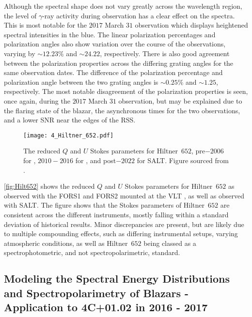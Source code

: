 Although the spectral shape does not vary greatly across the wavelength region, the level of $\gamma$-ray activity during observation has a clear effect on the spectra.
This is most notable for the $2017$ March $31$ observation which displays heightened spectral intensities in the blue.
The linear polarization percentages and polarization angles also show variation over the course of the observations, varying by $\sim 12.23\%$ and $\sim 24.22$\degree, respectively.
There is also good agreement between the polarization properties across the differing grating angles for the same observation dates.
The difference of the polarization percentage and polarization angle between the two grating angles is $\sim 0.25\%$ and $\sim 1.25$\degree, respectively.
The most notable disagreement of the polarization properties is seen, once again, during the $2017$ March $31$ observation, but may be explained due to the flaring state of the blazar, the asynchronous times for the two observations, and a lower \gls{SNR} near the edges of the \gls{RSS}.

\begin{figure}[t]
    \centering
    \texttt{[image: 4\_Hiltner\_652.pdf]}
    \caption{The reduced $Q$ and $U$ Stokes parameters for Hiltner~$652$, pre$-2006$ for , $2010 - 2016$ for , and post$-2022$ for \gls{SALT}. Figure sourced from \citep{cooper_HEASA2022}.}
    \label{fig:Hilt652}
\end{figure}

\autoref{fig:Hilt652} shows the reduced $Q$ and $U$ Stokes parameters for Hiltner~$652$ as observed with the \gls{FORS1} and \gls{FORS2} mounted at the \gls{VLT} \citep{FORS1, FORS2}, as well as observed with \gls{SALT}. The figure shows that the Stokes parameters of Hiltner~$652$ are consistent across the different instruments, mostly falling within a standard deviation of historical results. Minor discrepancies are present, but are likely due to multiple compounding effects, such as differing instrumental setups, varying atmospheric conditions, as well as Hiltner~$652$ being classed as a spectrophotometric, and not spectropolarimetric, standard.

\subsection[Modeling the Spectral Energy Distributions and Spectropolarimetry of Blazars - Application to 4C+01.02 in 2016 - 2017]{%
    Modeling the Spectral Energy Distributions and Spectro\-polari\-metry of Blazars - Application to 4C+01.02 in 2016 - 2017\\
    \citep{Schutte4C0102}
}


